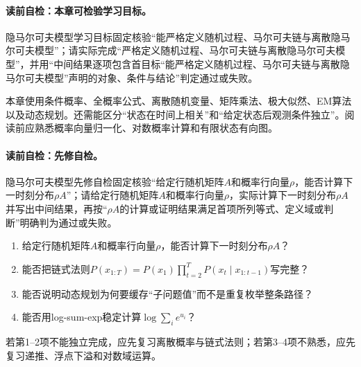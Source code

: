 \paragraph{读前自检：本章可检验学习目标。}隐马尔可夫模型学习目标固定核验“能严格定义随机过程、马尔可夫链与离散隐马尔可夫模型”；请实际完成“严格定义随机过程、马尔可夫链与离散隐马尔可夫模型”，并用“中间结果逐项包含首目标“能严格定义随机过程、马尔可夫链与离散隐马尔可夫模型”声明的对象、条件与结论”判定通过或失败。\par


\label{struct:V3-C05-CH02}
\begin{prerequisitebox}
本章使用条件概率、全概率公式、离散随机变量、矩阵乘法、极大似然、EM算法以及动态规划。还需能区分“状态在时间上相关”和“给定状态后观测条件独立”。阅读前应熟悉概率向量归一化、对数概率计算和有限状态有向图。
\end{prerequisitebox}

\label{struct:V3-C05-CH03}
\paragraph{读前自检：先修自检。}隐马尔可夫模型先修自检固定核验“给定行随机矩阵$A$和概率行向量$\rho$，能否计算下一时刻分布$\rho A$”；请给定行随机矩阵$A$和概率行向量$\rho$，实际计算下一时刻分布$\rho A$并写出中间结果，再按“$\rho A$的计算或证明结果满足首项所列等式、定义域或判断”明确判为通过或失败。\par

\begin{precheckbox}
\begin{enumerate}[leftmargin=2.2em]
  \item 给定行随机矩阵$A$和概率行向量$\rho$，能否计算下一时刻分布$\rho A$？
  \item 能否把链式法则$P(x_{1:T})=P(x_1)\prod_{t=2}^{T}P(x_t\mid x_{1:t-1})$写完整？
  \item 能否说明动态规划为何要缓存“子问题值”而不是重复枚举整条路径？
  \item 能否用log-sum-exp稳定计算$\log\sum_i e^{u_i}$？
\end{enumerate}
若第1--2项不能独立完成，应先复习离散概率与链式法则；若第3--4项不熟悉，应先复习递推、浮点下溢和对数域运算。
\end{precheckbox}

